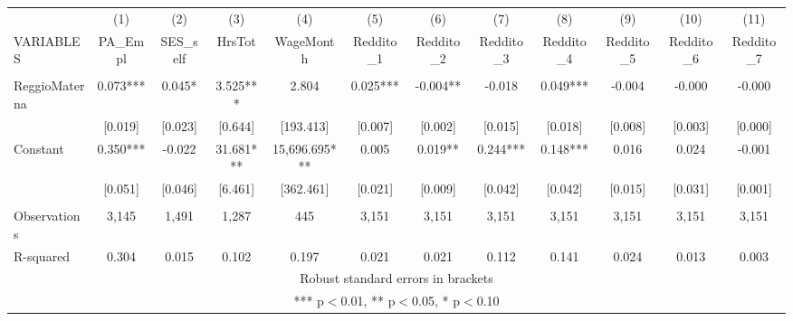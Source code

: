 \begin{tabular}{lccccccccccc} \hline
 & (1) & (2) & (3) & (4) & (5) & (6) & (7) & (8) & (9) & (10) & (11) \\
VARIABLES & PA\_Empl & SES\_self & HrsTot & WageMonth & Reddito\_1 & Reddito\_2 & Reddito\_3 & Reddito\_4 & Reddito\_5 & Reddito\_6 & Reddito\_7 \\ \hline
 &  &  &  &  &  &  &  &  &  &  &  \\
ReggioMaterna & 0.073*** & 0.045* & 3.525*** & 2.804 & 0.025*** & -0.004** & -0.018 & 0.049*** & -0.004 & -0.000 & -0.000 \\
 & [0.019] & [0.023] & [0.644] & [193.413] & [0.007] & [0.002] & [0.015] & [0.018] & [0.008] & [0.003] & [0.000] \\
Constant & 0.350*** & -0.022 & 31.681*** & 15,696.695*** & 0.005 & 0.019** & 0.244*** & 0.148*** & 0.016 & 0.024 & -0.001 \\
 & [0.051] & [0.046] & [6.461] & [362.461] & [0.021] & [0.009] & [0.042] & [0.042] & [0.015] & [0.031] & [0.001] \\
 &  &  &  &  &  &  &  &  &  &  &  \\
Observations & 3,145 & 1,491 & 1,287 & 445 & 3,151 & 3,151 & 3,151 & 3,151 & 3,151 & 3,151 & 3,151 \\
 R-squared & 0.304 & 0.015 & 0.102 & 0.197 & 0.021 & 0.021 & 0.112 & 0.141 & 0.024 & 0.013 & 0.003 \\ \hline
\multicolumn{12}{c}{ Robust standard errors in brackets} \\
\multicolumn{12}{c}{ *** p$<$0.01, ** p$<$0.05, * p$<$0.10} \\
\end{tabular}
